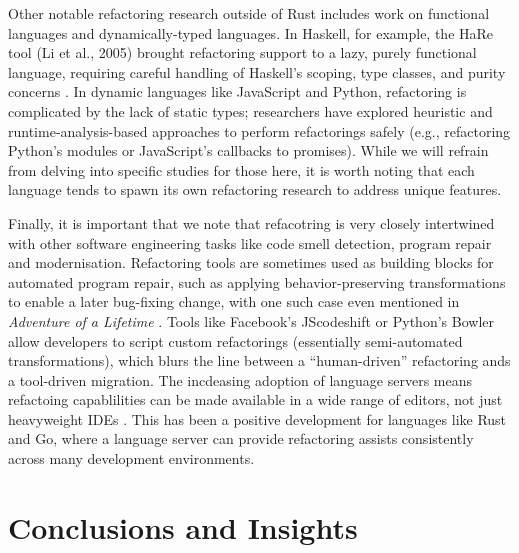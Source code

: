 Other notable refactoring research outside of Rust includes work on functional
languages and dynamically-typed languages. In Haskell, for example, the HaRe
tool (Li et al., 2005) brought refactoring support to a lazy, purely functional
language, requiring careful handling of Haskell's scoping, type classes, and
purity concerns \cite{HaRe}. In dynamic languages like JavaScript and Python, refactoring is
complicated by the lack of static types; researchers have explored heuristic and
runtime-analysis-based approaches to perform refactorings safely (e.g.,
refactoring Python's modules or JavaScript's callbacks to promises). While we
will refrain from delving into specific studies for those here, it is worth noting that each
language tends to spawn its own refactoring research to address unique features.

Finally, it is important that we note that refacotring is very closely
intertwined with other software engineering tasks like code smell detection,
program repair and modernisation. Refactoring tools are sometimes used as
building blocks for automated program repair, such as applying
behavior-preserving transformations to enable a later bug-fixing change, with
one such case even mentioned in
\textit{Adventure of a Lifetime} \cite{AdventureOfALifetime}. Tools like
Facebook’s JScodeshift or Python’s Bowler allow developers to script custom
refactorings (essentially semi-automated transformations), which blurs the line
between a ``human-driven'' refactoring ands a tool-driven migration. The
incdeasing adoption of language servers means refactoing capablilities can be
made available in a wide range of editors, not just heavyweight IDEs
\cite{AdventureOfALifetime}. This has been a positive development for languages
like Rust and Go, where a language server can provide refactoring assists
consistently across many development environments.

\section{Conclusions and Insights}\
\label{sec:lit_concusions}

\renewcommand\thefigure{\thechapter .\arabic{figure}}